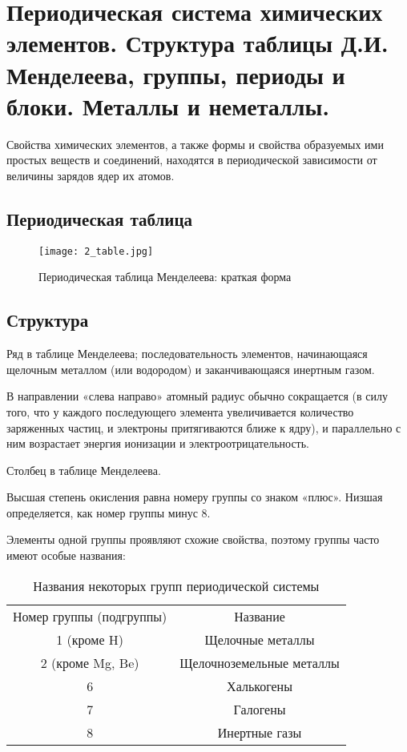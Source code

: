 \section{Периодическая система химических элементов. Структура таблицы Д.И. Менделеева, группы, периоды и блоки. Металлы и неметаллы.}


Свойства химических элементов, а также формы и свойства образуемых ими простых веществ и соединений, находятся в периодической зависимости от величины зарядов ядер их атомов.

\subsection{Периодическая таблица}

\begin{figure}[H]
    \centering
    \texttt{[image: 2\_table.jpg]}
    \caption{Периодическая таблица Менделеева: краткая форма}
    \label{fig:2table}
\end{figure}

\subsection{Структура}

Ряд в таблице Менделеева; последовательность элементов, начинающаяся щелочным металлом (или водородом) и заканчивающаяся инертным газом. 

В направлении «слева направо» атомный радиус обычно сокращается (в силу того, что у каждого последующего элемента увеличивается количество заряженных частиц, и электроны притягиваются ближе к ядру), и параллельно с ним возрастает энергия ионизации и электроотрицательность.


Столбец в таблице Менделеева. 

Высшая степень окисления равна номеру группы со знаком «плюс». Низшая определяется, как номер группы минус 8.

Элементы одной группы проявляют схожие свойства, поэтому группы часто имеют особые названия:

\begin{table}[H]
    \centering
    \begin{tabular}{c|c}
    \hline
        Номер группы (подгруппы) &  Название\\
         1 (кроме H) &  Щелочные металлы \\
         2 (кроме Mg, Be) &  Щелочноземельные металлы \\
         6 &  Халькогены \\
         7 &  Галогены \\
         8 &  Инертные газы \\
    \hline
    \end{tabular}
    \caption{Названия некоторых групп периодической системы}
    \label{tab:2groups}
\end{table}

